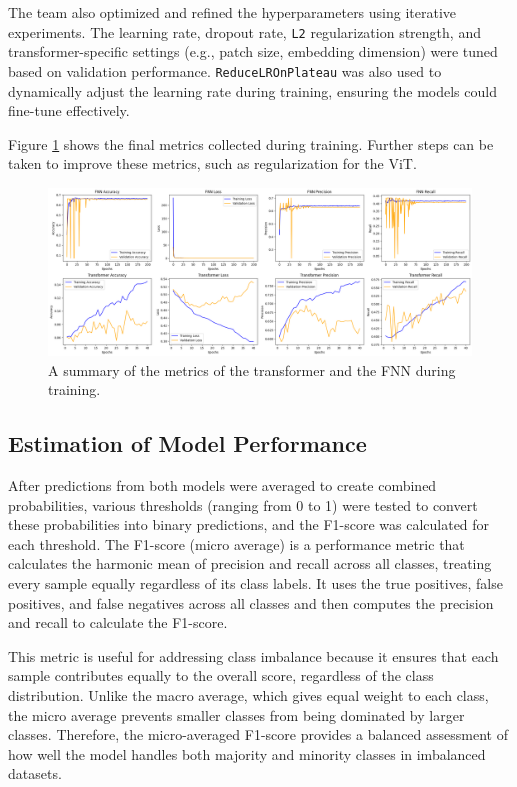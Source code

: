 \documentclass[12pt, conference]{IEEEtran}
\begin{document}
The team also optimized and refined the hyperparameters using iterative experiments. The learning rate, dropout rate, \texttt{L2} regularization strength, and transformer-specific settings (e.g., patch size, embedding dimension) were tuned based on validation performance. \texttt{ReduceLROnPlateau} was also used to dynamically adjust the learning rate during training, ensuring the models could fine-tune effectively.

Figure \ref{fig:metrics} shows the final metrics collected during training. Further steps can be taken to improve these metrics, such as regularization for the ViT.

\begin{figure}[htbp]
\centerline{\includegraphics[width=\columnwidth]{figures/metrics_all_data.png}}
\caption{A summary of the metrics of the transformer and the FNN during training.}
\label{fig:metrics}
\end{figure}

\subsection{Estimation of Model Performance}
After predictions from both models were averaged to create combined probabilities, various thresholds (ranging from 0 to 1) were tested to convert these probabilities into binary predictions, and the F1-score was calculated for each threshold. The F1-score (micro average) is a performance metric that calculates the harmonic mean of precision and recall across all classes, treating every sample equally regardless of its class labels. It uses the true positives, false positives, and false negatives across all classes and then computes the precision and recall to calculate the F1-score.

This metric is useful for addressing class imbalance because it ensures that each sample contributes equally to the overall score, regardless of the class distribution. Unlike the macro average, which gives equal weight to each class, the micro average prevents smaller classes from being dominated by larger classes. Therefore, the micro-averaged F1-score provides a balanced assessment of how well the model handles both majority and minority classes in imbalanced datasets.
\end{document}
